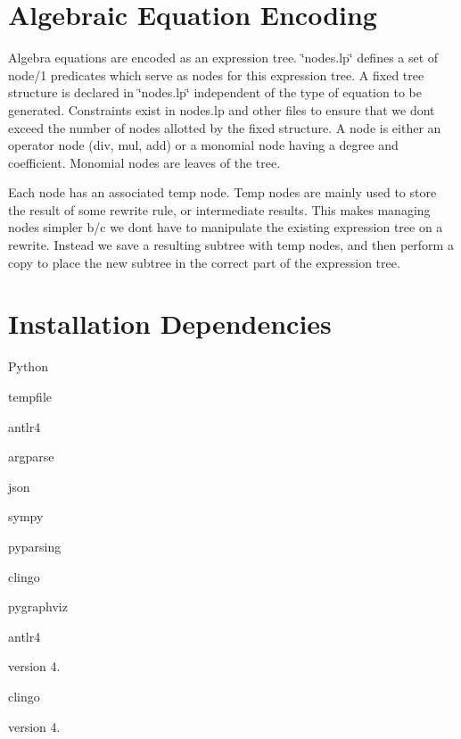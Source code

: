 \section*{Algebraic Equation Encoding }

Algebra equations are encoded as an expression tree. \char`\"{}nodes.\+lp\char`\"{} defines a set of node/1 predicates which serve as nodes for this expression tree. A fixed tree structure is declared in \char`\"{}nodes.\+lp\char`\"{} independent of the type of equation to be generated. Constraints exist in nodes.\+lp and other files to ensure that we don\textquotesingle{}t exceed the number of nodes allotted by the fixed structure. A node is either an operator node (div, mul, add) or a monomial node having a degree and coefficient. Monomial nodes are leaves of the tree.

Each node has an associated temp node. Temp nodes are mainly used to store the result of some rewrite rule, or intermediate results. This makes managing nodes simpler b/c we don\textquotesingle{}t have to manipulate the existing expression tree on a rewrite. Instead we save a resulting subtree with temp nodes, and then perform a copy to place the new subtree in the correct part of the expression tree.

\section*{Installation Dependencies }


\begin{DoxyItemize}
\item Python
\begin{DoxyEnumerate}
\item tempfile
\item antlr4
\item argparse
\item json
\item sympy
\item pyparsing
\item clingo
\item pygraphviz
\end{DoxyEnumerate}
\item antlr4
\begin{DoxyItemize}
\item version 4.
\end{DoxyItemize}
\item clingo
\begin{DoxyItemize}
\item version 4. 
\end{DoxyItemize}
\end{DoxyItemize}